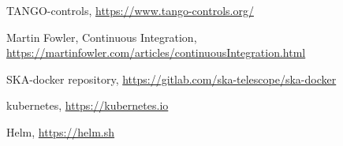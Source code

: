 \documentclass[a4paper,
               keeplastbox,   %
               ]{jacow}
\begin{document}
%
%
%
	{\printbibliography}%
	{%
	
	\begin{thebibliography}{9} %
	
		TANGO-controls,
		\url{https://www.tango-controls.org/}
	
		Martin Fowler, Continuous Integration,
		\url{https://martinfowler.com/articles/continuousIntegration.html}
		
		SKA-docker repository,
		\url{https://gitlab.com/ska-telescope/ska-docker}
	
		kubernetes,
		\url{https://kubernetes.io}
			
		Helm,
		\url{https://helm.sh}

	\end{thebibliography}
} %
%
% 

\end{document}
